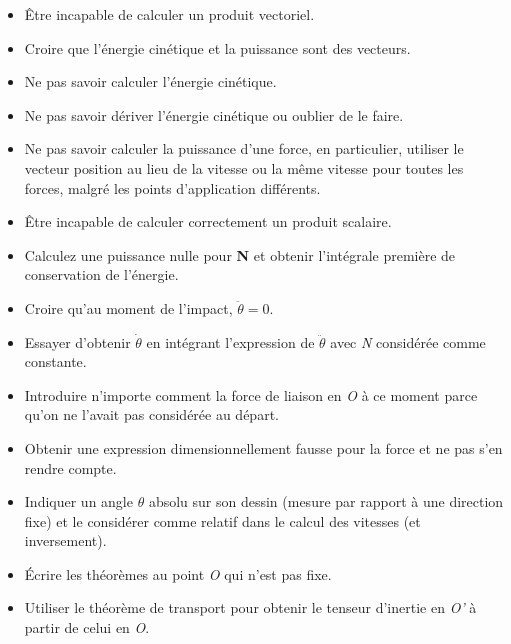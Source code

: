\documentclass[a4paper]{article}
\begin{document}
\begin{itemize}
\item Être incapable de calculer un produit vectoriel.

\item Croire que l’énergie cinétique et la puissance sont des vecteurs.

\item Ne pas savoir calculer l’énergie cinétique.

\item Ne pas savoir dériver l’énergie cinétique ou oublier de le faire.

\item Ne pas savoir calculer la puissance d’une force, en particulier, utiliser le vecteur position au lieu de la vitesse ou la même vitesse pour toutes les forces, malgré les points d’application différents. 
\item Être incapable de calculer correctement un produit scalaire.

\item Calculez une puissance nulle pour \textbf{N} et obtenir l’intégrale première de conservation de l’énergie.

\item Croire qu’au moment de l’impact, $ \ddot{\theta} = 0 $.

\item Essayer d’obtenir $ \dot{\theta} $ en intégrant l’expression de $ \ddot{\theta} $ avec \emph{N} considérée comme constante.

\item Introduire n’importe comment la force de liaison en \emph{O} à ce moment parce qu’on ne l’avait pas considérée au départ.

\item Obtenir une expression dimensionnellement fausse pour la force et ne pas s’en rendre compte.

\item Indiquer un angle $ \theta $ absolu sur son dessin (mesure par rapport à une direction fixe) et le considérer comme relatif dans le calcul des vitesses (et inversement).

\item Écrire les théorèmes au point \emph{O} qui n’est pas fixe.

\item Utiliser le théorème de transport pour obtenir le tenseur d’inertie en \emph{O'} à partir de celui en \emph{O}.

\end{itemize}
\end{document}
